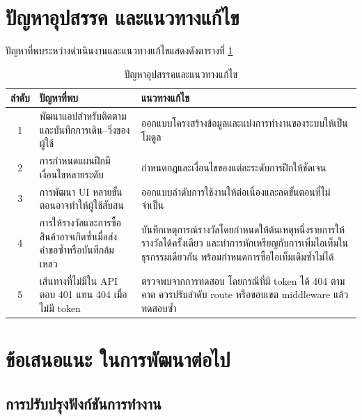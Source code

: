 \section{ปัญหาอุปสรรค และแนวทางแก้ไข}

ปัญหาที่พบระหว่างดำเนินงานและแนวทางแก้ไขแสดงดังตารางที่ \ref{tab:problems}

\begin{table}[H]
\centering
\caption{ปัญหาอุปสรรคและแนวทางแก้ไข}
\label{tab:problems}
\begin{tabular}{|c|>{\raggedright\arraybackslash}p{5.5cm}|>{\raggedright\arraybackslash}p{5.5cm}|}
\hline
\textbf{ลำดับ} & \textbf{ปัญหาที่พบ} & \textbf{แนวทางแก้ไข} \\
\hline
1 & พัฒนาแอปสำหรับติดตามและบันทึกการเดิน–วิ่งของผู้ใช้ & ออกแบบโครงสร้างข้อมูลและแบ่งการทำงานของระบบให้เป็นโมดูล \\ \hline
2 & การกำหนดแผนฝึกมีเงื่อนไขหลายระดับ & กำหนดกฎและเงื่อนไขของแต่ละระดับการฝึกให้ชัดเจน \\ \hline
3 & การพัฒนา UI หลายขั้นตอนอาจทำให้ผู้ใช้สับสน & ออกแบบลำดับการใช้งานให้ต่อเนื่องและลดขั้นตอนที่ไม่จำเป็น \\ \hline
4 & การให้รางวัลและการซื้อสินค้าอาจเกิดซ้ำเมื่อส่งคำขอซ้ำหรือบันทึกล้มเหลว & บันทึกเหตุการณ์รางวัลโดยกำหนดให้ต้นเหตุหนึ่งรายการให้รางวัลได้ครั้งเดียว และทำการหักเหรียญกับการเพิ่มไอเท็มในธุรกรรมเดียวกัน พร้อมกำหนดการซื้อไอเท็มเดิมซ้ำไม่ได้ \\ \hline
5 & เส้นทางที่ไม่มีใน API ตอบ 401 แทน 404 เมื่อไม่มี token & ตรวจพบจากการทดสอบ โดยกรณีที่มี token ได้ 404 ตามคาด ควรปรับลำดับ route หรือขอบเขต middleware แล้วทดสอบซ้ำ \\
\hline
\end{tabular}
\end{table}

\section{ข้อเสนอแนะ ในการพัฒนาต่อไป}
\label{sec:future-development}

\subsection{การปรับปรุงฟังก์ชันการทำงาน}

